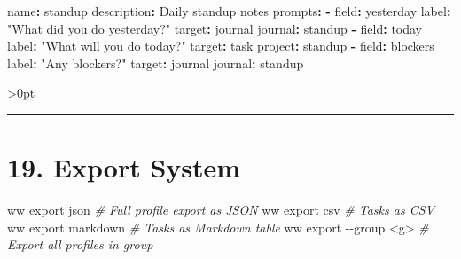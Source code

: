 \documentclass[11pt, a4paper, DIV=14]{scrartcl}
\newenvironment{Shaded}{%
  \vspace{4pt}%
  \begin{lrbox}{\ShadedBox}%
  \begin{minipage}{\dimexpr\linewidth-2\fboxsep\relax}%
  \vspace{4pt}%
}{%
  \vspace{4pt}%
  \end{minipage}%
  \end{lrbox}%
  \noindent\colorbox{CodeBg}{\usebox{\ShadedBox}}%
  \par\vspace{4pt}%
}
\newcommand{\AttributeTok}[1]{\textcolor{BabbTeal}{#1}}
\newcommand{\CommentTok}[1]{\textcolor{BabbGray}{\textit{#1}}}
\newcommand{\ExtensionTok}[1]{#1}
\newcommand{\FunctionTok}[1]{\textcolor{BabbNavy}{#1}}
\newcommand{\KeywordTok}[1]{\textbf{#1}}
\newcommand{\NormalTok}[1]{#1}
\newcommand{\OperatorTok}[1]{#1}
\newcommand{\StringTok}[1]{#1}
\newenvironment{Highlighting}{\ttfamily\fontsize{8.2}{11}\selectfont}{}
\let\origRule\rule
\renewcommand{\rule}[3][0pt]{%
  \ifnum\dimexpr#3\relax>0pt
    \par\vspace{2pt}\noindent{\color{BabbBorder}\origRule[#1]{#2}{#3}}\par\vspace{2pt}%
  \else
    \origRule[#1]{#2}{#3}%
  \fi
}
\begin{document}
\begin{Shaded}
\begin{Highlighting}[]
\FunctionTok{name}\KeywordTok{:}\AttributeTok{ standup}
\FunctionTok{description}\KeywordTok{:}\AttributeTok{ Daily standup notes}
\FunctionTok{prompts}\KeywordTok{:}
\AttributeTok{  }\KeywordTok{{-}}\AttributeTok{ }\FunctionTok{field}\KeywordTok{:}\AttributeTok{ yesterday}
\AttributeTok{    }\FunctionTok{label}\KeywordTok{:}\AttributeTok{ }\StringTok{"What did you do yesterday?"}
\AttributeTok{    }\FunctionTok{target}\KeywordTok{:}\AttributeTok{ journal}
\AttributeTok{    }\FunctionTok{journal}\KeywordTok{:}\AttributeTok{ standup}
\AttributeTok{  }\KeywordTok{{-}}\AttributeTok{ }\FunctionTok{field}\KeywordTok{:}\AttributeTok{ today}
\AttributeTok{    }\FunctionTok{label}\KeywordTok{:}\AttributeTok{ }\StringTok{"What will you do today?"}
\AttributeTok{    }\FunctionTok{target}\KeywordTok{:}\AttributeTok{ task}
\AttributeTok{    }\FunctionTok{project}\KeywordTok{:}\AttributeTok{ standup}
\AttributeTok{  }\KeywordTok{{-}}\AttributeTok{ }\FunctionTok{field}\KeywordTok{:}\AttributeTok{ blockers}
\AttributeTok{    }\FunctionTok{label}\KeywordTok{:}\AttributeTok{ }\StringTok{"Any blockers?"}
\AttributeTok{    }\FunctionTok{target}\KeywordTok{:}\AttributeTok{ journal}
\AttributeTok{    }\FunctionTok{journal}\KeywordTok{:}\AttributeTok{ standup}
\end{Highlighting}
\end{Shaded}

\begin{center}\rule{0.5\linewidth}{0.5pt}\end{center}

\section{19. Export System}\label{export-system}

\begin{Shaded}
\begin{Highlighting}[]
\ExtensionTok{ww}\NormalTok{ export json          }\CommentTok{\# Full profile export as JSON}
\ExtensionTok{ww}\NormalTok{ export csv           }\CommentTok{\# Tasks as CSV}
\ExtensionTok{ww}\NormalTok{ export markdown      }\CommentTok{\# Tasks as Markdown table}
\ExtensionTok{ww}\NormalTok{ export }\AttributeTok{{-}{-}group} \OperatorTok{\textless{}}\NormalTok{g}\OperatorTok{\textgreater{}}   \CommentTok{\# Export all profiles in group}
\end{Highlighting}
\end{Shaded}
\end{document}
